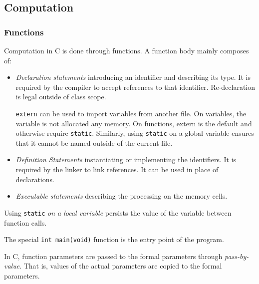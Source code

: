 \raggedright
\subsection{Computation}
\subsubsection{Functions}
Computation in C is done through functions. A function body mainly composes of: 
\begin{itemize}
  \item \textit{Declaration statements} introducing an identifier and
    describing its type. It is required by the compiler to accept references to
    that identifier. Re-declaration is legal outside of class scope.
    \begin{remark}
      \verb|extern| can be used to import variables from another file. On
      variables, the variable is not allocated any memory. On functions, extern
      is the default and otherwise require \verb|static|. Similarly, using
      \verb|static| on a global variable ensures that it cannot be named
      outside of the current file. 
    \end{remark}
  \item \textit{Definition Statements} instantiating or implementing the identifiers. It
    is required by the linker to link references. It can be used in place of
    declarations.
  \item \textit{Executable statements} describing the processing on the memory
    cells.
\end{itemize}
\begin{remark}
  Using \verb|static| \textit{on a local variable} persists the value of the
  variable between function calls.
\end{remark}
\begin{remark}
  The special \verb|int main(void)| function is the entry point of the program.
\end{remark}

In C, function parameters are passed to the formal parameters through
\textit{pass-by-value}. That is, values of the actual parameters are copied to
the formal parameters.

